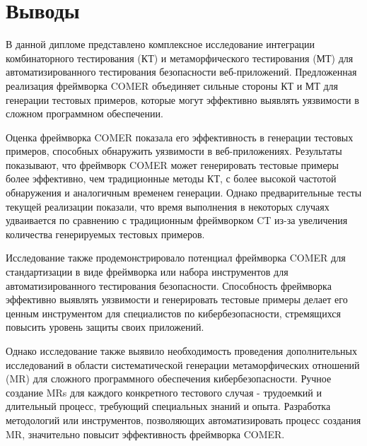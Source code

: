 \chapter{Выводы}
\label{chap:conclusion}

В данной дипломе представлено комплексное исследование интеграции комбинаторного тестирования (КТ) и метаморфического тестирования (МТ) для автоматизированного тестирования безопасности веб-приложений. Предложенная реализация фреймворка COMER объединяет сильные стороны КТ и МТ для генерации тестовых примеров, которые могут эффективно выявлять уязвимости в сложном программном обеспечении.

Оценка фреймворка COMER показала его эффективность в генерации тестовых примеров, способных обнаружить уязвимости в веб-приложениях. Результаты показывают, что фреймворк COMER может генерировать тестовые примеры более эффективно, чем традиционные методы КТ, с более высокой частотой обнаружения и аналогичным временем генерации. Однако предварительные тесты текущей реализации показали, что время выполнения в некоторых случаях удваивается по сравнению с традиционным фреймворком CT из-за увеличения количества генерируемых тестовых примеров.

Исследование также продемонстрировало потенциал фреймворка COMER для стандартизации в виде фреймворка или набора инструментов для автоматизированного тестирования безопасности. Способность фреймворка эффективно выявлять уязвимости и генерировать тестовые примеры делает его ценным инструментом для специалистов по кибербезопасности, стремящихся повысить уровень защиты своих приложений.

Однако исследование также выявило необходимость проведения дополнительных исследований в области систематической генерации метаморфических отношений (MR) для сложного программного обеспечения кибербезопасности. Ручное создание MRs для каждого конкретного тестового случая - трудоемкий и длительный процесс, требующий специальных знаний и опыта. Разработка методологий или инструментов, позволяющих автоматизировать процесс создания MR, значительно повысит эффективность фреймворка COMER.
